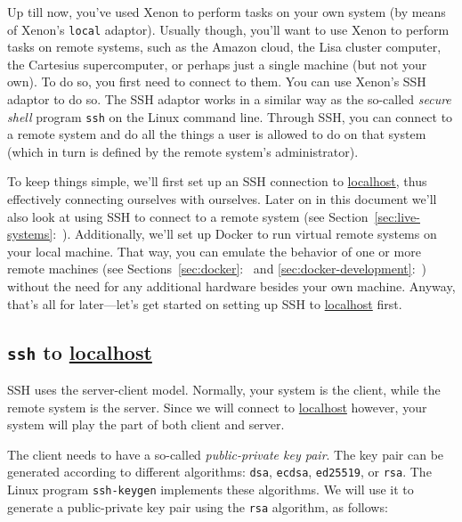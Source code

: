 \documentclass[12pt, a4paper, twoside, openany, titlepage]{book}
\begin{document}
Up till now, you've used Xenon to perform tasks on your own system (by means of Xenon's \texttt{local} adaptor). Usually though, you'll want to use Xenon to perform tasks on remote systems, such as the Amazon cloud, the Lisa cluster computer, the Cartesius supercomputer, or perhaps just a single machine (but not your own). To do so, you first need to connect to them. You can use Xenon's SSH adaptor to do so. The SSH adaptor works in a similar way as the so-called \textit{secure shell} program \texttt{ssh} on the Linux command line. Through SSH, you can connect to a remote system and do all the things a user is allowed to do on that system (which in turn is defined by the remote system's administrator).

To keep things simple, we'll first set up an SSH connection to \url{localhost}, thus effectively connecting ourselves with ourselves. Later on in this document we'll also look at using SSH to connect to a remote system (see Section~\ref{sec:live-systems}:~\textit{}). Additionally, we'll set up Docker to run virtual remote systems on your local machine. That way, you can emulate the behavior of one or more remote machines (see Sections~\ref{sec:docker}:~\textit{} and \ref{sec:docker-development}:~\textit{}) without the need for any additional hardware besides your own machine. Anyway, that's all for later---let's get started on setting up SSH to \url{localhost} first.

\subsection{\texttt{ssh} to \url{localhost}}

SSH uses the server-client model. Normally, your system is the client, while the remote system is the server. Since we will connect to \url{localhost} however, your system will play the part of both client and server.

The client needs to have a so-called \textit{public-private key pair}. The key pair can be generated according to different algorithms:
\texttt{dsa},
\texttt{ecdsa},
\texttt{ed25519}, or
\texttt{rsa}.
The Linux program \texttt{ssh-keygen} implements these algorithms. We will use it to generate a public-private key pair using the \texttt{rsa} algorithm, as follows:
\end{document}
